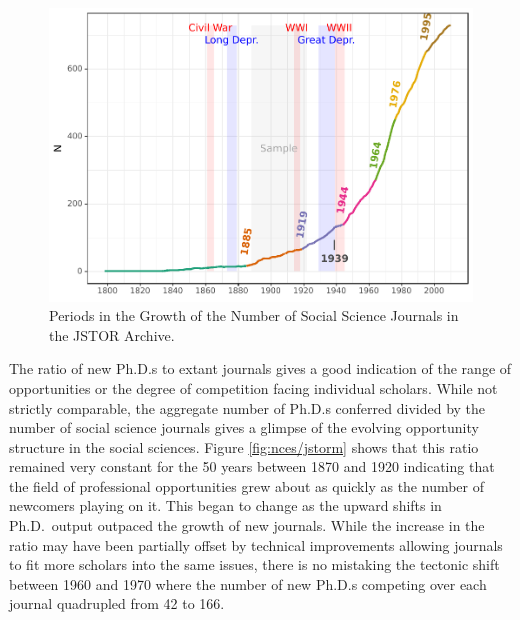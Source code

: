 \documentclass[]{book}
\theoremstyle{definition}
\theoremstyle{definition}
\theoremstyle{definition}
\theoremstyle{remark}
\begin{document}
\begin{figure}

{\centering \includegraphics[width=0.9\linewidth]{04_files/figure-latex/jstorm2fig-1} 

}

\caption{Periods in the Growth of the Number of Social Science Journals in the JSTOR Archive.}\label{fig:jstorm2fig}
\end{figure}

The ratio of new Ph.D.s to extant journals gives a good indication of
the range of opportunities or the degree of competition facing
individual scholars. While not strictly comparable, the aggregate number
of Ph.D.s conferred divided by the number of social science journals
gives a glimpse of the evolving opportunity structure in the social
sciences. Figure \ref{fig:nces/jstorm} shows that this ratio remained
very constant for the 50 years between 1870 and 1920 indicating that the
field of professional opportunities grew about as quickly as the number
of newcomers playing on it. This began to change as the upward shifts in
Ph.D.~output outpaced the growth of new journals. While the increase in
the ratio may have been partially offset by technical improvements
allowing journals to fit more scholars into the same issues, there is no
mistaking the tectonic shift between 1960 and 1970 where the number of
new Ph.D.s competing over each journal quadrupled from 42 to 166.
\end{document}
